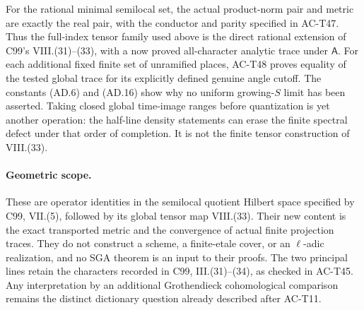 \begin{remark}
For the rational minimal semilocal set, the actual
product-norm pair and metric are exactly the real
pair, with the conductor and parity specified in
AC-T47.  Thus the full-index tensor family used
above is the direct rational extension of C99's
VIII.(31)--(33), with a now proved all-character
analytic trace under \(\mathsf A\).
For each additional fixed finite set of unramified
places, AC-T48 proves equality of the tested
global trace for its explicitly defined genuine
angle cutoff.
The constants (AD.6) and (AD.16) show why no
uniform growing-\(S\) limit has been asserted.
Taking closed global time-image ranges before
quantization is yet another operation: the
half-line density statements can erase the
finite spectral defect under that order of
completion.  It is not the finite tensor
construction of VIII.(33).
\end{remark}

\paragraph{Geometric scope.}
These are operator identities in the semilocal quotient
Hilbert space specified by C99, VII.(5), followed by its
global tensor map VIII.(33).
Their new content is the exact transported metric and
the convergence of actual finite projection traces.
They do not construct a scheme, a finite-etale cover,
or an \(\ell\)-adic realization, and no SGA theorem is
an input to their proofs.
The two principal lines retain the characters recorded
in C99, III.(31)--(34), as checked in AC-T45.
Any interpretation by an additional Grothendieck
cohomological comparison remains the distinct
dictionary question already described after AC-T11.
